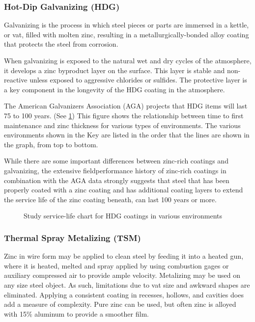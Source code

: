 \subsubsection{Hot-Dip Galvanizing (HDG)}
Galvanizing is the process in which steel pieces or parts are immersed in a kettle, or vat, filled with molten zinc, resulting in a metallurgically-bonded alloy coating that protects the steel from corrosion.

When galvanizing is exposed to the natural wet and dry cycles of the atmosphere, it develops a zinc byproduct layer on the surface. This layer is stable and non-reactive unless exposed to aggressive chlorides or sulfides. The protective layer is a key component in the longevity of the HDG coating in the atmosphere.

The American Galvanizers Association (AGA) projects that HDG items will last 75 to 100 years. (See \cref{fig:hdg-various-environments}) This figure shows the relationship between time to first maintenance and zinc thickness for various types of
environments. The various environments shown in the Key are listed in the order that the lines are shown in the
graph, from top to bottom.

While there are some important differences between zinc-rich coatings and galvanizing, the extensive fieldperformance history of zinc-rich coatings in combination with the AGA data strongly suggests that steel that has been
properly coated with a zinc coating and has additional coating layers to extend the service life of the zinc coating beneath, can last 100 years or more.

\begin{figure}
  \caption{Study service-life chart for HDG coatings in various environments}
  \label{fig:hdg-various-environments}
\end{figure}

\subsubsection{Thermal Spray Metalizing (TSM)}
Zinc in wire form may be applied to clean steel by feeding it into a heated gun, where it is heated, melted and
spray applied by using combustion gages or auxiliary compressed air to provide ample velocity. Metalizing may be
used on any size steel object. As such, limitations due to vat size and awkward shapes are eliminated. Applying a
consistent coating in recesses, hollows, and cavities does add a measure of complexity. Pure zinc can be used, but
often zinc is alloyed with 15\% aluminum to provide a smoother film.

